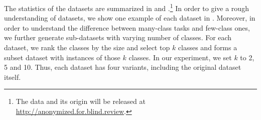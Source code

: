 The statistics of the datasets are summarized in 
and .\footnote{The data and its origin 
will be released at \url{http://anonymized.for.blind.review}.} 
In order to give a rough understanding of datasets, we show one example of
each dataset in . 
Moreover, in order to understand the difference between many-class tasks and few-class ones, 
we further generate sub-datasets with varying number of classes. 
For each dataset, we rank the classes by the size and select top $k$ classes and forms 
a subset dataset with instances of those $k$ classes.
In our experiment, we set $k$ to 2, 5 and 10. Thus, each dataset has four variants,
including the original dataset itself.




